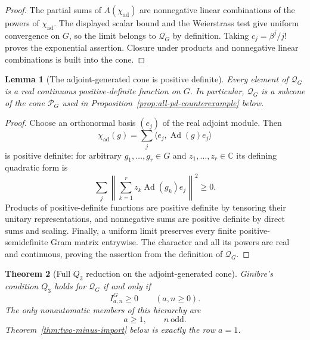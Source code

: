 \documentclass[11pt,reqno]{amsart}
\theoremstyle{plain}
\newtheorem{theorem}{Theorem}[section]
\newtheorem{lemma}[theorem]{Lemma}
\theoremstyle{definition}
\newcommand{\chiad}{\chi_{\mathrm{ad}}}
\newcommand{\Qcone}{\mathcal Q}
\begin{document}
\begin{proof}
The partial sums of \(A(\chiad)\) are nonnegative linear combinations of
the powers of \(\chiad\).  The displayed scalar bound and the Weierstrass
test give uniform convergence on \(G\), so the limit belongs to
\(\Qcone_G\) by definition.  Taking \(c_j=\beta^j/j!\) proves the
exponential assertion.  Closure under products and nonnegative linear
combinations is built into the cone.
\end{proof}

\begin{lemma}[The adjoint-generated cone is positive definite]
\label{lem:adjoint-cone-positive-definite}
Every element of $\Qcone_G$ is a real continuous positive-definite function
on $G$.  In particular, $\Qcone_G$ is a subcone of the cone $\mathcal P_G$
used in Proposition~\ref{prop:all-pd-counterexample} below.
\end{lemma}

\begin{proof}
Choose an orthonormal basis $(e_j)$ of the real adjoint module.  Then
\[
 \chiad(g)=\sum_j\langle e_j,\operatorname{Ad}(g)e_j\rangle
\]
is positive definite: for arbitrary $g_1,\ldots,g_r\in G$ and
$z_1,\ldots,z_r\in\mathbb C$ its defining quadratic form is
\[
 \sum_j\left\lVert\sum_{k=1}^r
 z_k\operatorname{Ad}(g_k)e_j\right\rVert^2\geq0.
\]
Products of positive-definite functions are positive definite by tensoring
their unitary representations, and nonnegative sums are positive definite by
direct sums and scaling.  Finally, a uniform limit preserves every finite
positive-semidefinite Gram matrix entrywise.  The character and all its
powers are real and continuous, proving the assertion from the definition of
$\Qcone_G$.
\end{proof}

\begin{theorem}[Full $Q_3$ reduction on the adjoint-generated cone]
\label{thm:full-cone-reduction}
Ginibre's condition $Q_3$ holds for $\Qcone_G$ if and only if
\[
 I^G_{a,n}\geq0\qquad(a,n\geq0).
\]
The only nonautomatic members of this hierarchy are
\[
 a\geq1,\qquad n\ \text{odd}.
\]
Theorem~\ref{thm:two-minus-import} below is exactly the row $a=1$.
\end{theorem}
\end{document}
